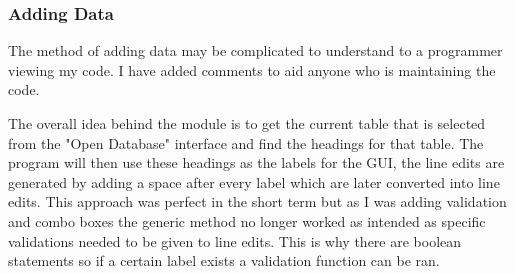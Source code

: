 \subsubsection{Adding Data}

The method of adding data may be complicated to understand to a programmer viewing my code. I have added comments to aid anyone who is maintaining the code.

The overall idea behind the module is to get the current table that is selected from the  "Open Database" interface and find the headings for that table. The program will then use these headings as the labels for the GUI, the line edits are generated by adding a space after every label which are later converted into line edits. This approach was perfect in the short term but as I was adding validation and combo boxes the generic method no longer worked as intended as specific validations needed to be given to line edits. This is why there are boolean statements so if a certain label exists a validation function can be ran.

